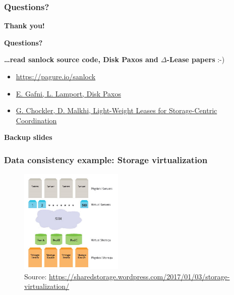 \documentclass[10pt,utf8]{beamer}
\begin{document}
\begin{frame}
    \frametitle{Questions?}
    \centering
     \textbf{\Huge{Thank you!}}
    
    \vspace{1.5cm}
    
    \textbf{\Huge{Questions?}}
    
    \vspace{1cm}
    
    \centering
    \textbf{\dots read sanlock source code, Disk Paxos and $\Delta$-Lease papers} :-)
    \vspace{0.5cm}
    \begin{itemize}
    \item \small \color{blue}\url{https://pagure.io/sanlock}\color{black}
     \item \color{blue}\href{http://lamport.azurewebsites.net/pubs/disk-paxos-disc.pdf}{E. Gafni, L. Lamport, Disk Paxos}\color{black}
     \item \color{blue}\href{https://groups.csail.mit.edu/tds/papers/Chockler/TR934.ps}{G. Chockler, D. Malkhi, Light-Weight Leases for Storage-Centric Coordination}\color{black}
    \end{itemize}

\end{frame}


\begin{frame}
	\centering
	\huge{\textbf{Backup slides}}
\end{frame}

\begin{frame}
  \frametitle{Data consistency example: Storage virtualization}
  \begin{figure}
    \centering
    \includegraphics[height=5cm]{./img/virt-storage.eps}
    \caption{\tiny{Source: \url{https://sharedstorage.wordpress.com/2017/01/03/storage-virtualization/}}}
  \end{figure}
\end{frame}
\end{document}
